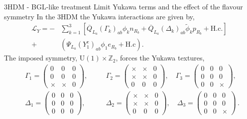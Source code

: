 \documentclass[10pt,xcolor=dvipsnames,mathserif]{beamer}
\begin{document}
\begin{frame}{3HDM - BGL-like treatment Limit }{Yukawa terms and the effect of the flavour symmetry}
    In the 3HDM the Yukawa interactions are given by,
    \begin{equation*} 
    \label{eq:3HDM_Yuk} 
    \begin{split} 
    \mathcal{L}_Y = - & \sum_{k=1}^3 \left[ \overline{Q}_{L_a} \left( \Gamma_k \right)_{ab} \phi_k n_{R_b} + \overline{Q}_{L_a} \left( \Delta_k \right)_{ab} \tilde{\phi}_k p_{R_b} + \text{H.c}.  \right] \\ + & \left( \Psi_{L_a} \left( Y^e_1 \right)_{ab} \phi_1 e_{R_b} + \text{H.c} \right) .
    \end{split} 
    \end{equation*} 
    The imposed symmetry, $\mathrm{U}(1)\times\mathbb{Z}_2$, forces the Yukawa textures,  
    \begin{equation*}
    \begin{aligned}
    \label{Lovely_Equations}
    &\Gamma_1  = \begin{pmatrix}
    0 & 0 & 0\\
    0 & 0 & 0\\
    \times & \times & 0
    \end{pmatrix}, \quad 
    &&\Gamma_2  = \begin{pmatrix}
    \times & \times & 0\\
    \times & \times & 0\\
    0 & 0 & 0
    \end{pmatrix}, \quad
    \Gamma_3  = \begin{pmatrix}
    0 & 0 & 0\\
    0 & 0 & 0\\
    0 & 0 & \times
    \end{pmatrix}, \\[1em]
    &\Delta_1  = \begin{pmatrix}
    0 & 0 & 0\\
    0 & 0 & 0\\
    0 & 0 & 0
    \end{pmatrix}, \quad 
    &&\Delta_2 = \begin{pmatrix}
    \times & \times & 0\\
    \times & \times & 0\\
    0 & 0 & 0
    \end{pmatrix} , \quad 
    \Delta_3 = \begin{pmatrix}
    0 & 0 & 0\\
    0 & 0 & 0\\
    0 & 0 & \times
    \end{pmatrix}  \, . 
    \end{aligned} 
    \end{equation*}
\end{frame}
\end{document}
